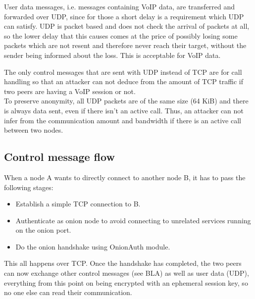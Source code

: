 \documentclass{article}
\begin{document}
User data messages, i.e. messages containing VoIP data, are transferred and forwarded over UDP, since for those a short delay is a requirement which UDP can satisfy. UDP is packet based and does not check the arrival of packets at all, so the lower delay that this causes comes at the price of possibly losing some packets which are not resent and therefore never reach their target, without the sender being informed about the loss. This is acceptable for VoIP data.

The only control messages that are sent with UDP instead of TCP are for call handling so that an attacker can not deduce from the amount of TCP traffic if two peers are having a VoIP session or not. \\

To preserve anonymity, all UDP packets are of the same size (64 KiB) and there is always data sent, even if there isn't an active call. Thus, an attacker can not infer from the communication amount and bandwidth if there is an active call between two nodes.


\subsection{Control message flow}
When a node A wants to directly connect to another node B, it has to pass the following stages:
\begin{itemize}
	\item Establish a simple TCP connection to B.
	\item Authenticate as onion node to avoid connecting to unrelated services running on the onion port.
	\item Do the onion handshake using OnionAuth module.
\end{itemize}
This all happens over TCP. Once the handshake has completed, the two peers can now exchange other control messages (see BLA) as well as user data (UDP), everything from this point on being encrypted with an ephemeral session key, so no one else can read their communication. \\
\end{document}
